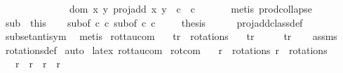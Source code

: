 \begin{isabellebody}
\ \ \ \ \ \ \ \ \ \ \ \ \ \ {\isacharparenleft}dom\ {\isacharparenleft}{\isasymlambda}{\isacharparenleft}x{\isacharcomma}\ y{\isacharparenright}{\isachardot}\ proj{\isacharunderscore}add\ x\ y{\isacharparenright}\ {\isasyminter}\ c{}\ {\isasymtimes}\ c{}{\isacharparenright}{\isachardoublequoteclose}\ \isanewline
\ \ \ \ \isamarkupfalse%
\ {\isacharparenleft}metis\ prod{\isachardot}collapse{\isacharparenright}\isanewline
\ \ \isamarkupfalse%
\isacommand{{\isacharbraceright}}\isamarkupfalse%
\isanewline
\ \ \isamarkupfalse%
\ sub\ {\isacharequal}\ this\isanewline
\ \ \isamarkupfalse%
\ sub{\isacharbrackleft}of\ c{}\ c{}{\isacharbrackright}\ sub{\isacharbrackleft}of\ c{}\ c{}{\isacharbrackright}\ \isanewline
\ \ \isamarkupfalse%
\ {\isacharquery}thesis\ \isanewline
\ \ \ \isamarkupfalse%
\ proj{\isacharunderscore}add{\isacharunderscore}class{\isacharunderscore}def\ \isamarkupfalse%
\ subset{\isacharunderscore}antisym\ \isamarkupfalse%
\ metis\isanewline
{}\isamarkupfalse%
%
\endisatagproof
{\isafoldproof}%
%
\isadelimproof
\isanewline
%
\endisadelimproof
\isanewline
{}\isamarkupfalse%
\ rot{\isacharunderscore}tau{\isacharunderscore}com{\isacharcolon}\isanewline
\ \ \ {\isachardoublequoteopen}tr\ {\isasymin}\ rotations{\isachardoublequoteclose}\isanewline
\ \ \ {\isachardoublequoteopen}tr\ {\isasymcirc}\ {\isasymtau}\ {\isacharequal}\ {\isasymtau}\ {\isasymcirc}\ tr{\isachardoublequoteclose}\isanewline
%
\isadelimproof
\ \ %
\endisadelimproof
%
\isatagproof
{}\isamarkupfalse%
\ assms\ \isamarkupfalse%
\ rotations{\isacharunderscore}def\ \isamarkupfalse%
{\isacharparenleft}auto{\isacharparenright}%
\endisatagproof
{\isafoldproof}%
%
\isadelimproof
\isanewline
%
\endisadelimproof
\isanewline
{}\isamarkupfalse%
\ {\isacharparenleft}latex{\isacharparenright}\ rot{\isacharunderscore}tau{\isacharunderscore}com\isanewline
\isanewline
{}\isamarkupfalse%
\ rot{\isacharunderscore}com{\isacharcolon}\isanewline
\ \ \ {\isachardoublequoteopen}r\ {\isasymin}\ rotations{\isachardoublequoteclose}\ {\isachardoublequoteopen}r{\isacharprime}\ {\isasymin}\ rotations{\isachardoublequoteclose}\isanewline
\ \ \ {\isachardoublequoteopen}r{\isacharprime}\ {\isasymcirc}\ r\ {\isacharequal}\ r\ {\isasymcirc}\ r{\isacharprime}{\isachardoublequoteclose}\ \isanewline

\end{isabellebody}
